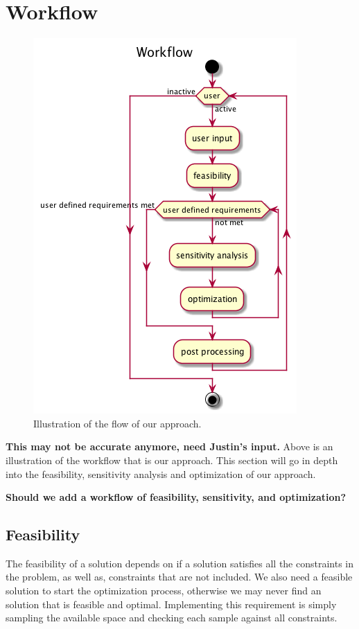 \documentclass[10pt]{article}
\begin{document}
\section{Workflow}
\label{sec:workflow}
 		\begin{figure}[h!]
		 \begin{center}\includegraphics[scale=.4]{IMSM_Workflow.png}\end{center}
		 \caption{Illustration of the flow of our approach.}
		 \label{Workflow}
		 
		 \end{figure}
		 
		 \textbf{This may not be accurate anymore, need Justin's input.}
Above is an illustration of the workflow that is our approach. This section will go in depth into the feasibility, sensitivity analysis and optimization of our approach.

\textbf{Should we add a workflow of feasibility, sensitivity, and optimization?}

\subsection{Feasibility}
\label{sec:Feasibility}

The feasibility of a solution depends on if a solution satisfies all the constraints in the problem, as well as, constraints that are not included. We also need a feasible solution to start the optimization process, otherwise we may never find an solution that is feasible and optimal. Implementing this requirement is simply sampling the available space and checking each sample against all constraints. 
\end{document}
